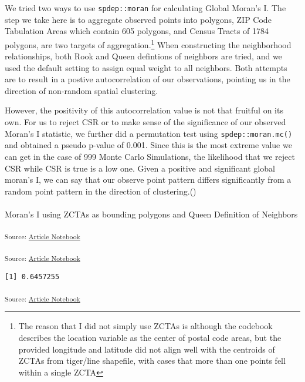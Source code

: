 \documentclass[
  letterpaper,
  DIV=11,
  numbers=noendperiod]{scrartcl}
\makeatletter
\let\oldparagraph\paragraph
\renewcommand{\paragraph}{
    \@ifstar
      \xxxParagraphStar
      \xxxParagraphNoStar
  }
\newcommand{\xxxParagraphStar}[1]{\oldparagraph*{#1}\mbox{}}
\newcommand{\xxxParagraphNoStar}[1]{\oldparagraph{#1}\mbox{}}
\makeatother
\begin{document}
We tried two ways to use \texttt{spdep::moran} for calculating Global
Moran's I. The step we take here is to aggregate observed points into
polygons, ZIP Code Tabulation Areas which contain 605 polygons, and
Census Tracts of 1784 polygons, are two targets of
aggregation.\footnote{The reason that I did not simply use ZCTAs is
  although the codebook describes the location variable as the center of
  postal code areas, but the provided longitude and latitude did not
  align well with the centroids of ZCTAs from tiger/line shapefile, with
  cases that more than one points fell within a single ZCTA} When
constructing the neighborhood relationships, both Rook and Queen
defintions of neighbors are tried, and we used the default setting to
assign equal weight to all neighbors. Both attempts are to result in a
postive autocorrelation of our observations, pointing us in the
direction of non-random spatial clustering.

However, the positivity of this autocorrelation value is not that
fruitful on its own. For us to reject CSR or to make sense of the
significance of our observed Moran's I statistic, we further did a
permutation test using \texttt{spdep::moran.mc()} and obtained a pseudo
p-value of 0.001. Since this is the most extreme value we can get in the
case of 999 Monte Carlo Simulations, the likelihood that we reject CSR
while CSR is true is a low one. Given a positive and significant global
moran's I, we can say that our observe point pattern differs
significantly from a random point pattern in the direction of
clustering.()

\paragraph{Moran's I using ZCTAs as bounding polygons and Queen
Definition of
Neighbors}\label{morans-i-using-zctas-as-bounding-polygons-and-queen-definition-of-neighbors}

\textsubscript{Source:
\href{https://h-christy.github.io/24-manuscript/index.qmd.html}{Article
Notebook}}

\textsubscript{Source:
\href{https://h-christy.github.io/24-manuscript/index.qmd.html}{Article
Notebook}}

\begin{verbatim}
[1] 0.6457255
\end{verbatim}

\textsubscript{Source:
\href{https://h-christy.github.io/24-manuscript/index.qmd.html}{Article
Notebook}}
\end{document}
